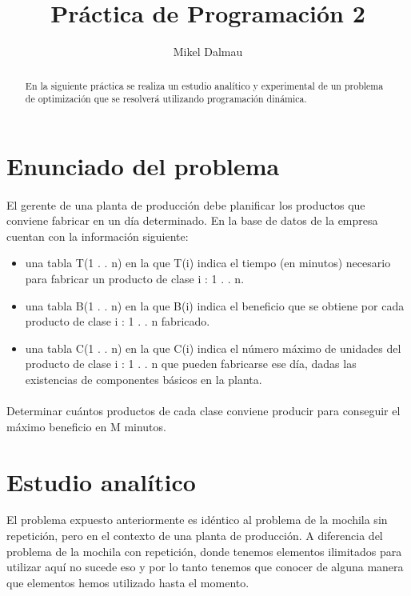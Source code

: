 \documentclass[es]{ifirak}
\begin{document}
\title{Práctica de Programación 2}
\author{Mikel Dalmau}

\maketitle

\begin{abstract}
	\large{
En la siguiente práctica se realiza un estudio analítico y experimental de un problema de optimización que se resolverá utilizando programación dinámica.}
\end{abstract}


\section{Enunciado del problema}
\paragraph{}
\large{
El gerente de una planta de producción debe planificar los productos que conviene fabricar en un día determinado. En la base de datos de la empresa cuentan con la información siguiente:

\begin{itemize}
	\item una tabla T(1 . . n) en la que T(i) indica el tiempo (en minutos) necesario para fabricar un producto de clase i : 1 . . n.
	\item una tabla B(1 . . n) en la que B(i) indica el beneficio que se obtiene por cada producto de clase i : 1 . . n fabricado.
	\item una tabla C(1 . . n) en la que C(i) indica el número máximo de unidades del producto de clase i : 1 . . n que pueden fabricarse ese día, dadas las existencias de componentes básicos en la planta.
\end{itemize}
\paragraph{}
Determinar cuántos productos de cada clase conviene producir para conseguir el máximo beneficio en M minutos.
}
\section{Estudio analítico}
El problema expuesto anteriormente es idéntico al problema de la mochila sin repetición, pero en el contexto de una planta de producción. A diferencia del problema de la mochila con repetición, donde tenemos elementos ilimitados para utilizar aquí no sucede eso y por lo tanto tenemos que conocer de alguna manera que elementos hemos utilizado hasta el momento.\\
\end{document}
